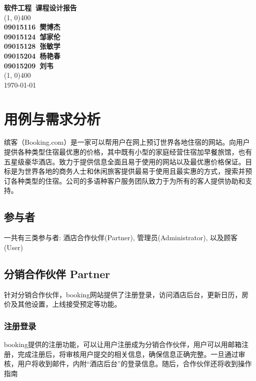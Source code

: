 \documentclass[11pt]{article}
\begin{document}
\begin{titlepage}
\begin{center}

	\huge{\textbf{软件工程\ 课程设计报告}}\\

	\vfill
	\line(1, 0){400} \\ [1mm]
	\large{\textbf{09015116\ 樊博杰}} \\ [1mm]
	\large{\textbf{09015124\ 邹家伦}} \\ [1mm]
	\large{\textbf{09015128\ 张敏学}} \\ [1mm]
	\large{\textbf{09015204\ 杨艳春}} \\ [1mm]
	\large{\textbf{09015209\ 刘韦}} \\ [1mm]
	\line(1, 0){400} \\
	\large{\today}\\
\end{center}
\end{titlepage}

\tableofcontents
\thispagestyle{empty}
\clearpage


\setcounter{page}{1}
\section{用例与需求分析}
   缤客（Booking.com）是一家可以帮用户在网上预订世界各地住宿的网站。向用户提供各种类型住宿最优惠的价格，其中既有小型的家庭经营住宿加早餐旅馆，也有五星级豪华酒店。致力于提供信息全面且易于使用的网站以及最优惠价格保证。目标是为世界各地的商务人士和休闲旅客提供最易于使用且最实惠的方式，搜索并预订各种类型的住宿。公司的多语种客户服务团队致力于为所有的客人提供协助和支持。
	\subsection{参与者}
	一共有三类参与者: 酒店合作伙伴(Partner), 管理员(Administrator), 以及顾客(User)
	\subsection{分销合作伙伴 Partner}
		针对分销合作伙伴，booking网站提供了注册登录，访问酒店后台，更新日历，房价及其他设置，上线接受预定等功能。
		\subsubsection{注册登录}
		booking提供的注册功能，可以让用户注册成为分销合作伙伴，用户可以用邮箱注册，完成注册后，将审核用户提交的相关信息，确保信息正确完整。一旦通过审核，用户将收到邮件，内附“酒店后台”的登录信息。随后，合作伙伴还将收到操作指南
\end{document}
